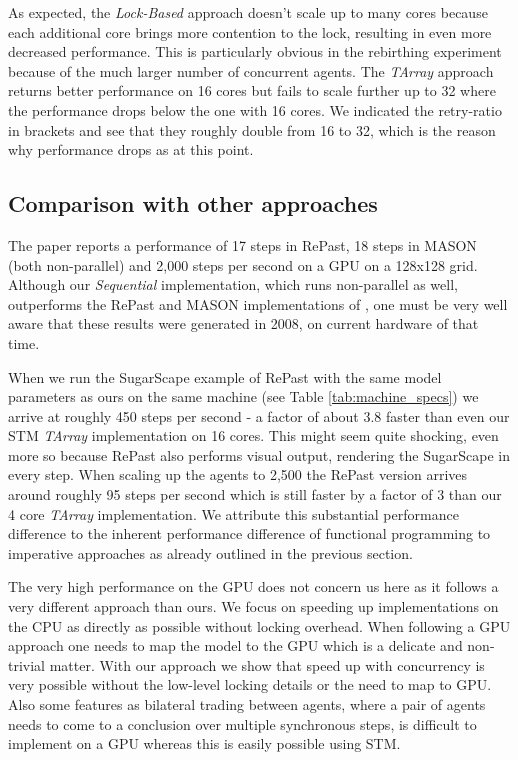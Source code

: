 As expected, the \textit{Lock-Based} approach doesn't scale up to many cores because each additional core brings more contention to the lock, resulting in even more decreased performance. This is particularly obvious in the rebirthing experiment because of the much larger number of concurrent agents. The \textit{TArray} approach returns better performance on 16 cores but fails to scale further up to 32 where the performance drops below the one with 16 cores. We indicated the retry-ratio in brackets and see that they roughly double from 16 to 32, which is the reason why performance drops as at this point. 

%

\subsection{Comparison with other approaches}
The paper \cite{lysenko_framework_2008} reports a performance of 17 steps in RePast, 18 steps in MASON (both non-parallel) and 2,000 steps per second on a GPU on a 128x128 grid. Although our \textit{Sequential} implementation, which runs non-parallel as well, outperforms the RePast and MASON implementations of \cite{lysenko_framework_2008}, one must be very well aware that these results were generated in 2008, on current hardware of that time.

When we run the SugarScape example of RePast with the same model parameters as ours on the same machine (see Table \ref{tab:machine_specs}) we arrive at roughly 450 steps per second - a factor of about 3.8 faster than even our STM \textit{TArray} implementation on 16 cores. This might seem quite shocking, even more so because RePast also performs visual output, rendering the SugarScape in every step. When scaling up the agents to 2,500 the RePast version arrives around roughly 95 steps per second which is still faster by a factor of 3 than our 4 core \textit{TArray} implementation. We attribute this substantial performance difference to the inherent performance difference of functional programming to imperative approaches as already outlined in the previous section. 

The very high performance on the GPU does not concern us here as it follows a very different approach than ours. We focus on speeding up implementations on the CPU as directly as possible without locking overhead. When following a GPU approach one needs to map the model to the GPU which is a delicate and non-trivial matter. With our approach we show that speed up with concurrency is very possible without the low-level locking details or the need to map to GPU. Also some features as bilateral trading between agents, where a pair of agents needs to come to a conclusion over multiple synchronous steps, is difficult to implement on a GPU whereas this is easily possible using STM.

